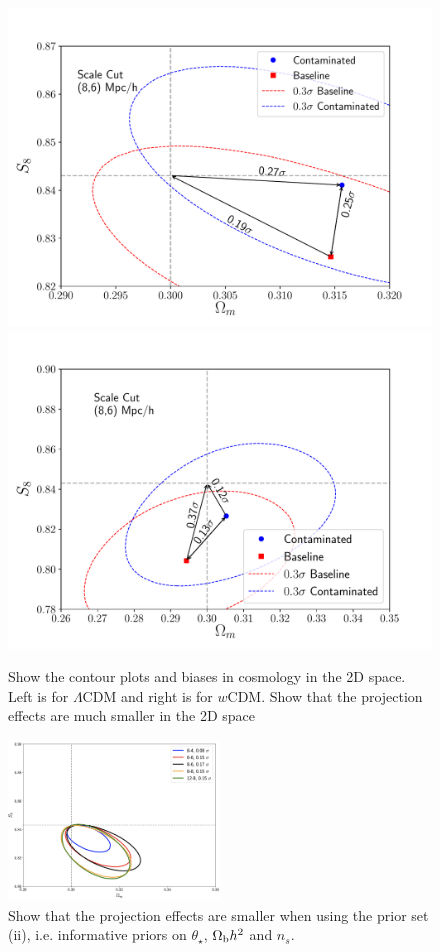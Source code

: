 \documentclass[fleqn,usenatbib]{mnras}
\begin{document}
\begin{figure}
\includegraphics[width=\columnwidth]{figs/contour_2x2pt_sc_8_6.pdf}
\includegraphics[width=\columnwidth]{figs/contour_2x2pt_sc_8_6_wcdm.pdf}
\caption[]{Show the contour plots and biases in cosmology in the 2D space. Left is for $\Lambda$CDM and right is for $w$CDM. Show that the projection effects are much smaller in the 2D space}
\label{fig:2d_simlike}
\end{figure}

\begin{figure}
\includegraphics[width=0.5\textwidth,draft]{figs/temp.png}
\caption[]{Show that the projection effects are smaller when using the prior set (ii), i.e. informative priors on $\theta_{\star}$, $\Omega_{\rm b} h^2$ and $n_s$.}
\label{fig:simlike_cosmoprior}
\end{figure}





\bsp	%
\label{lastpage}

% 
%  
\end{document}
